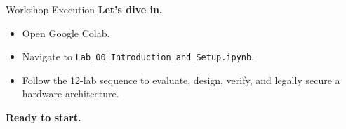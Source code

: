 \documentclass[aspectratio=169,10pt]{beamer}
\begin{document}
\begin{frame}{Workshop Execution}
  \textbf{Let's dive in.}

  \vspace{0.3cm}
  \begin{itemize}
    \item Open Google Colab.
    \item Navigate to \texttt{Lab\_00\_Introduction\_and\_Setup.ipynb}.
    \item Follow the 12-lab sequence to evaluate, design, verify, and legally secure a hardware architecture.
  \end{itemize}

  \vspace{1cm}
  \begin{center}
    \textcolor{ArchBlue}{\Large \faLaptopCode} \hspace{0.2cm} \textbf{Ready to start.}
  \end{center}
\end{frame}
\end{document}
